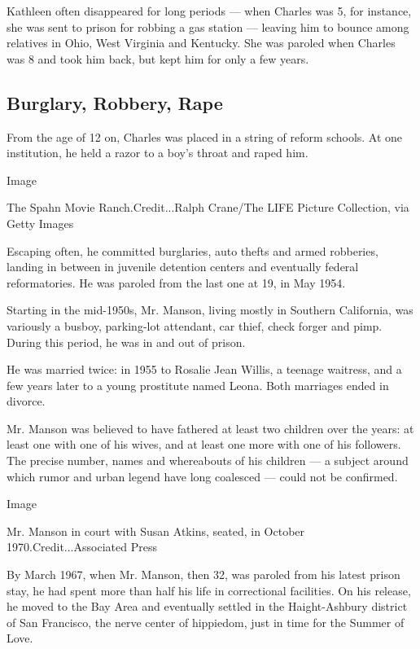 Kathleen often disappeared for long periods --- when Charles was 5, for
instance, she was sent to prison for robbing a gas station --- leaving
him to bounce among relatives in Ohio, West Virginia and Kentucky. She
was paroled when Charles was 8 and took him back, but kept him for only
a few years.

\hypertarget{burglary-robbery-rape}{%
\subsection{Burglary, Robbery, Rape}\label{burglary-robbery-rape}}

From the age of 12 on, Charles was placed in a string of reform schools.
At one institution, he held a razor to a boy's throat and raped him.

Image

The Spahn Movie Ranch.Credit...Ralph Crane/The LIFE Picture Collection,
via Getty Images

Escaping often, he committed burglaries, auto thefts and armed
robberies, landing in between in juvenile detention centers and
eventually federal reformatories. He was paroled from the last one at
19, in May 1954.

Starting in the mid-1950s, Mr. Manson, living mostly in Southern
California, was variously a busboy, parking-lot attendant, car thief,
check forger and pimp. During this period, he was in and out of prison.

He was married twice: in 1955 to Rosalie Jean Willis, a teenage
waitress, and a few years later to a young prostitute named Leona. Both
marriages ended in divorce.

Mr. Manson was believed to have fathered at least two children over the
years: at least one with one of his wives, and at least one more with
one of his followers. The precise number, names and whereabouts of his
children --- a subject around which rumor and urban legend have long
coalesced --- could not be confirmed.

Image

Mr. Manson in court with Susan Atkins, seated, in October
1970.Credit...Associated Press

By March 1967, when Mr. Manson, then 32, was paroled from his latest
prison stay, he had spent more than half his life in correctional
facilities. On his release, he moved to the Bay Area and eventually
settled in the Haight-Ashbury district of San Francisco, the nerve
center of hippiedom, just in time for the Summer of Love.

